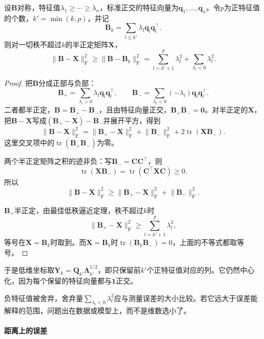 \begin{theorem}[半正定低秩近似]
\label{thm:smap-psd-truncation}
设$\bm B$对称，特征值$\lambda_1\geq\cdots\geq\lambda_n$，标准正交的特征向量为$\bm q_1,\ldots,\bm q_n$。令$p$为正特征值的个数，$k'=\min(k,p)$，并记
\begin{equation}
 \bm B_k=\sum_{l\leq k'}\lambda_l\bm q_l\bm q_l^\top .
 \label{eq:smap-psd-truncation}
\end{equation}
则对一切秩不超过$k$的半正定矩阵$\bm X$，
\begin{equation}
 \lVert\bm B-\bm X\rVert_{\mathrm F}^2\geq\lVert\bm B-\bm B_k\rVert_{\mathrm F}^2
 =\sum_{l=k'+1}^{p}\lambda_l^2+\sum_{\lambda_l<0}\lambda_l^2 .
 \label{eq:smap-psd-truncation-bound}
\end{equation}
\end{theorem}
\begin{proof}
把$\bm B$分成正部与负部：
\[
 \bm B_+=\sum_{\lambda_l>0}\lambda_l\bm q_l\bm q_l^\top,\qquad
 \bm B_-=\sum_{\lambda_l<0}(-\lambda_l)\bm q_l\bm q_l^\top .
\]
二者都半正定，$\bm B=\bm B_+-\bm B_-$，且由特征向量正交，$\bm B_+\bm B_-=\bm0$。对半正定的$\bm X$，把$\bm B-\bm X$写成$(\bm B_+-\bm X)-\bm B_-$并展开平方，得到
\[
 \lVert\bm B-\bm X\rVert_{\mathrm F}^2
 =\lVert\bm B_+-\bm X\rVert_{\mathrm F}^2+\lVert\bm B_-\rVert_{\mathrm F}^2+2\operatorname{tr}(\bm X\bm B_-) .
\]
这里交叉项中的$\operatorname{tr}(\bm B_+\bm B_-)$为零。

两个半正定矩阵之积的迹非负：写$\bm B_-=\bm C\bm C^\top$，则
\[
 \operatorname{tr}(\bm X\bm B_-)=\operatorname{tr}(\bm C^\top\bm X\bm C)\geq0 .
\]
所以
\[
 \lVert\bm B-\bm X\rVert_{\mathrm F}^2\geq\lVert\bm B_+-\bm X\rVert_{\mathrm F}^2+\lVert\bm B_-\rVert_{\mathrm F}^2 .
\]

$\bm B_+$半正定，由最佳低秩逼近定理，秩不超过$k$时
\[
 \lVert\bm B_+-\bm X\rVert_{\mathrm F}^2\geq\sum_{l=k'+1}^p\lambda_l^2 ,
\]
等号在$\bm X=\bm B_k$时取到。而$\bm X=\bm B_k$时$\operatorname{tr}(\bm B_k\bm B_-)=0$，上面的不等式都取等号。
\end{proof}

于是低维坐标取$\bm Y_k=\bm Q_{k'}\bm\Lambda_{k'}^{1/2}$，即只保留前$k'$个正特征值对应的列。它仍然中心化，因为每个保留的特征向量都与$\bm1$正交。

负特征值被舍弃，舍弃量$\sum_{\lambda_l<0}\lambda_l^2$应与测量误差的大小比较。若它远大于误差能解释的范围，问题出在数据或模型上，而不是维数选小了。

\paragraph{距离上的误差}

